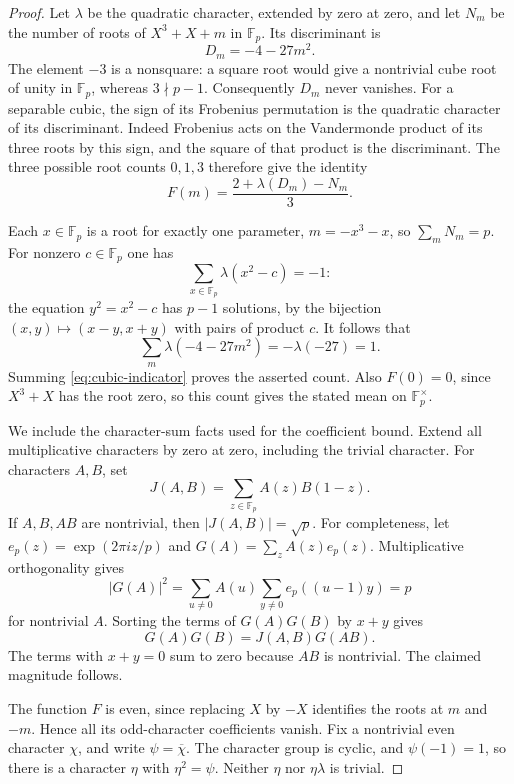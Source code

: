 \documentclass[11pt]{article}
\theoremstyle{definition}
\theoremstyle{remark}
\begin{document}
\begin{proof}
Let $\lambda$ be the quadratic character, extended by zero at zero,
and let $N_m$ be the number of roots of $X^3+X+m$ in $\mathbb F_p$.
Its discriminant is
\[
 D_m=-4-27m^2.
\]
The element $-3$ is a nonsquare: a square root would give a
nontrivial cube root of unity in $\mathbb F_p$, whereas
$3\nmid p-1$.  Consequently $D_m$ never vanishes.  For a separable
cubic, the sign of its Frobenius permutation is the quadratic
character of its discriminant.  Indeed Frobenius acts on the
Vandermonde product of its three roots by this sign, and the square
of that product is the discriminant.  The three possible root
counts $0,1,3$ therefore give the identity
\begin{equation}
 F(m)=\frac{2+\lambda(D_m)-N_m}{3}.
 \label{eq:cubic-indicator}
\end{equation}

Each $x\in\mathbb F_p$ is a root for exactly one parameter,
$m=-x^3-x$, so $\sum_mN_m=p$.
For nonzero $c\in\mathbb F_p$ one has
\[
 \sum_{x\in\mathbb F_p}\lambda(x^2-c)=-1:
\]
the equation $y^2=x^2-c$ has $p-1$ solutions, by the bijection
$(x,y)\mapsto(x-y,x+y)$ with pairs of product $c$.
It follows that
\[
 \sum_m\lambda(-4-27m^2)=-\lambda(-27)=1.
\]
Summing \eqref{eq:cubic-indicator} proves the asserted count.
Also $F(0)=0$, since $X^3+X$ has the root zero, so this count gives
the stated mean on $\mathbb F_p^\times$.

We include the character-sum facts used for the coefficient bound.
Extend all multiplicative characters by zero at zero, including
the trivial character.  For characters $A,B$, set
\[
 J(A,B)=\sum_{z\in\mathbb F_p}A(z)B(1-z).
\]
If $A,B,AB$ are nontrivial, then $|J(A,B)|=\sqrt p$.
For completeness, let $e_p(z)=\exp(2\pi i z/p)$ and
$G(A)=\sum_zA(z)e_p(z)$.  Multiplicative orthogonality gives
\[
 |G(A)|^2
 =\sum_{u\ne0}A(u)\sum_{y\ne0}e_p((u-1)y)=p
\]
for nontrivial $A$.  Sorting the terms of $G(A)G(B)$ by
$x+y$ gives
\[
 G(A)G(B)=J(A,B)G(AB).
\]
The terms with $x+y=0$ sum to zero because $AB$ is nontrivial.
The claimed magnitude follows.

The function $F$ is even, since replacing $X$ by $-X$ identifies
the roots at $m$ and $-m$.  Hence all its odd-character coefficients
vanish.  Fix a nontrivial even character $\chi$, and write
$\psi=\overline\chi$.  The character group is cyclic, and
$\psi(-1)=1$, so there is a character $\eta$ with
$\eta^2=\psi$.  Neither $\eta$ nor $\eta\lambda$ is trivial.


\end{proof}
\end{document}
